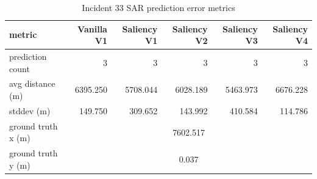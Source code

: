 \begin{table}[ht]
\centering
\caption{Incident 33 SAR prediction error metrics}
\label{tab:sar-incident-33}
\begin{tabular}{lrrrrr}
\hline
metric & Vanilla V1 & Saliency V1 & Saliency V2 & Saliency V3 & Saliency V4 \\
\hline
prediction count & 3 & 3 & 3 & 3 & 3 \\
avg distance (m) & 6395.250 & 5708.044 & 6028.189 & 5463.973 & 6676.228 \\
stddev (m) & 149.750 & 309.652 & 143.992 & 410.584 & 114.786 \\
ground truth x (m) & \multicolumn{5}{c}{7602.517} \\
ground truth y (m) & \multicolumn{5}{c}{0.037} \\
\hline
\end{tabular}
\end{table}

